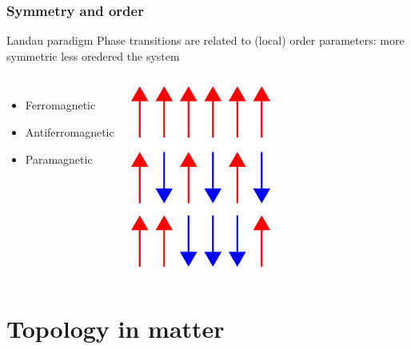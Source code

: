 \begin{frame}

    \frametitle{Symmetry and order}
    \begin{block}{Landau paradigm}
        Phase transitions are related to (local) order parameters:
        more symmetric less oredered the system
    \end{block}

    \begin{columns}
    \begin{itemize}
        \item Ferromagnetic
        \item Antiferromagnetic
        \item Paramagnetic
    \end{itemize}
        \includegraphics[width=0.5\textwidth]{phases_of_matter/spin_chains.png}
    \end{columns}

\end{frame}




\section{Topology in matter}


